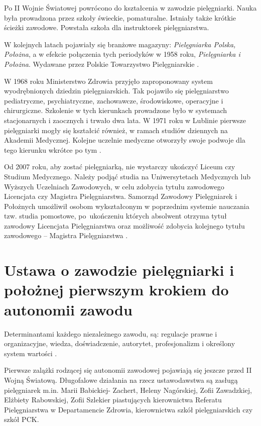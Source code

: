 \documentclass[a4paper,12pt,twoside,openright]{mwrep}
\begin{document}
Po II Wojnie Światowej powrócono do kształcenia w zawodzie pielęgniarki. Nauka była prowadzona przez szkoły świeckie, pomaturalne. Istniały także krótkie ścieżki zawodowe. Powstała szkoła dla instruktorek pielęgniarstwa.

W kolejnych latach pojawiały się branżowe magazyny: \textit{Pielęgniarka Polska, Położna}, a w efekcie połączenia tych periodyków w 1958 roku, \textit{Pielęgniarka i Położna}. Wydawane przez Polskie Towarzystwo Pielęgniarskie \cite{czas}.

W 1968 roku Ministerstwo Zdrowia przyjęło zaproponowany system wyodrębnionych dziedzin pielęgniarskich. Tak pojawiło się pielęgniarstwo pediatryczne, psychiatryczne, zachowawcze, środowiskowe, operacyjne i chirurgiczne. Szkolenie w tych kierunkach prowadzone było w systemach stacjonarnych i zaocznych i trwało dwa lata. W 1971 roku w Lublinie pierwsze pielęgniarki mogły się kształcić również, w ramach studiów dziennych na Akademii Medycznej. Kolejne uczelnie medyczne otworzyły swoje podwoje dla tego kierunku wkrótce po tym \cite{spec}.
 
Od 2007 roku, aby zostać pielęgniarką, nie wystarczy ukończyć Liceum czy Studium Medycznego. Należy podjąć studia na Uniwersytetach Medycznych lub Wyższych Uczelniach Zawodowych, w celu zdobycia tytułu zawodowego Licencjata czy Magistra Pielęgniarstwa. Samorząd Zawodowy Pielęgniarek i Położnych umożliwił osobom wykształconym w poprzednim systemie nauczania tzw. studia pomostowe, po~ukończeniu których absolwent otrzyma tytuł zawodowy Licencjata Pielęgniarstwa oraz możliwość zdobycia kolejnego tytułu zawodowego – Magistra Pielęgniarstwa \cite{model}.

\section{Ustawa o zawodzie pielęgniarki i położnej pierwszym krokiem do autonomii zawodu}
Determinantami każdego niezależnego zawodu, są: regulacje prawne i organizacyjne, wiedza, doświadczenie, autorytet, profesjonalizm i określony system wartości \cite{deter}.

Pierwsze zalążki rodzącej się autonomii zawodowej pojawiają się jeszcze przed II Wojną Światową. Długofalowe działania na rzecz ustawodawstwa są zasługą pielęgniarek m.in.  Marii Babickiej- Zachert, Heleny Nagórskiej, Zofii Zawadzkiej, Elżbiety Rabowskiej, Zofii Szlekier piastujących kierownictwa Referatu Pielęgniarstwa w Departamencie Zdrowia, kierownictwa szkół pielęgniarskich czy  szkół PCK.
\end{document}
